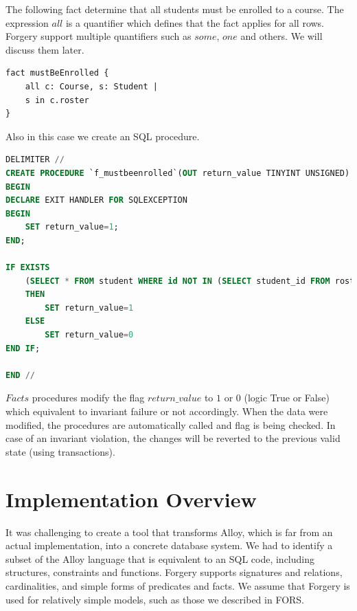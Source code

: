 \documentclass[oneside]{book}
\begin{document}
The following fact determine that all students must be enrolled to a course. The expression $all$ is a quantifier which defines that the fact applies for all rows. Forgery support multiple quantifiers such as $some$, $one$ and others. We will discuss them later.

\begin{lstlisting}
fact mustBeEnrolled {
	all c: Course, s: Student | 
	s in c.roster
}
\end{lstlisting}

Also in this case we create an SQL procedure.

\begin{lstlisting}[escapechar=@,language=SQL]
DELIMITER //
CREATE PROCEDURE `f_mustbeenrolled`(OUT return_value TINYINT UNSIGNED)
BEGIN
DECLARE EXIT HANDLER FOR SQLEXCEPTION
BEGIN
	SET return_value=1;
END;

IF EXISTS
	(SELECT * FROM student WHERE id NOT IN (SELECT student_id FROM roster))
	THEN
		SET return_value=1
	ELSE
		SET return_value=0
END IF;
	
END //
\end{lstlisting}

$Facts$ procedures modify the flag $return\_value$ to $1$ or $0$ (logic True or False) which equivalent to invariant failure or not accordingly. When the data were modified, the procedures are automatically called and flag is being checked. In case of an invariant violation, the changes will be reverted to the previous valid state (using transactions).\\

\newpage

\section{Implementation Overview}
It was challenging to create a tool that transforms Alloy, which is far from an actual implementation, into a concrete database system. We had to identify a subset of the Alloy language that is equivalent to an SQL code, including structures, constraints and functions. Forgery supports signatures and relations, cardinalities, and simple forms of predicates and facts. We assume that Forgery is used for relatively simple models, such as those we described in FORS.
\end{document}
